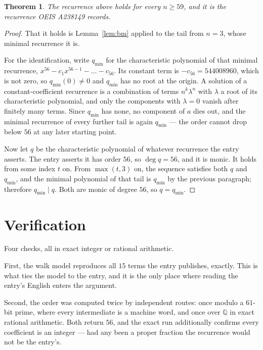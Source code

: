 \documentclass[11pt,a4paper]{article}
\theoremstyle{plain}
\newtheorem{theorem}{Theorem}
\theoremstyle{definition}
\begin{document}
\begin{theorem}
The recurrence above holds for every $n\ge59$, and it is the recurrence OEIS A238149 records.
\end{theorem}

\begin{proof}
That it holds is Lemma~\ref{lem:bm} applied to the tail from $n=3$, whose minimal
recurrence it is.

For the identification, write $q_{\min}$ for the characteristic polynomial of that minimal
recurrence, $x^{56}-c_1x^{56-1}-\dots-c_{56}$. Its constant term is
$-c_{56}=544008960$, which is not zero, so $q_{\min}(0)\neq0$ and $q_{\min}$ has no
root at the origin. A solution of a constant-coefficient recurrence is a combination of terms
$n^{k}\lambda^{n}$ with $\lambda$ a root of its characteristic polynomial, and only the
components with $\lambda=0$ vanish after finitely many terms. Since $q_{\min}$ has none, no
component of $a$ dies out, and the minimal recurrence of every further tail is again
$q_{\min}$ --- the order cannot drop below $56$ at any later starting point.

Now let $q$ be the characteristic polynomial of whatever recurrence the entry asserts. The
entry asserts it has order $56$, so $\deg q=56$, and it is monic. It holds from some
index $t$ on. From $\max(t,3)$ on, the sequence satisfies both $q$ and $q_{\min}$, and
the minimal polynomial of that tail is $q_{\min}$ by the previous paragraph; therefore
$q_{\min}\mid q$. Both are monic of degree $56$, so $q=q_{\min}$.
\end{proof}

\section{Verification}

Four checks, all in exact integer or rational arithmetic.

First, the walk model reproduces all $15$ terms the entry publishes, exactly. This is
what ties the model to the entry, and it is the only place where reading the entry's English
enters the argument.

Second, the order was computed twice by independent routes: once modulo a $61$-bit prime, where
every intermediate is a machine word, and once over $\mathbb{Q}$ in exact rational arithmetic.
Both return $56$, and the exact run additionally confirms every coefficient is an integer
--- had any been a proper fraction the recurrence would not be the entry's.
\end{document}
